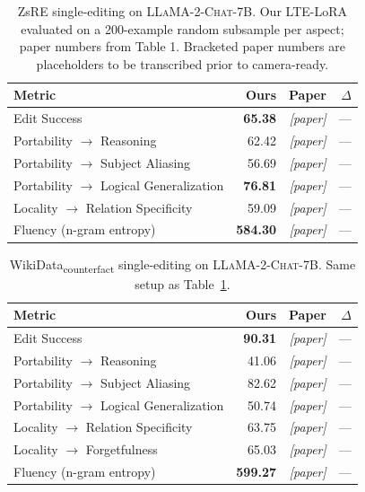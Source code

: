 \documentclass[11pt,a4paper,twocolumn]{article}
\begin{document}
\begin{table}[t]
\centering
\small
\caption{ZsRE single-editing on \textsc{LLaMA-2-Chat-7B}. Our LTE-LoRA evaluated on a 200-example random subsample per aspect; paper numbers from \citet{jiang2024learning} Table 1. Bracketed paper numbers are placeholders to be transcribed prior to camera-ready.}
\label{tab:zsre}
\begin{tabular}{lrrr}
\toprule
\textbf{Metric} & \textbf{Ours} & \textbf{Paper} & \textbf{$\Delta$} \\
\midrule
Edit Success                                       & \textbf{65.38} & \textit{[paper]}  & --- \\
Portability $\rightarrow$ Reasoning                & 62.42         & \textit{[paper]}  & --- \\
Portability $\rightarrow$ Subject Aliasing         & 56.69         & \textit{[paper]}  & --- \\
Portability $\rightarrow$ Logical Generalization   & \textbf{76.81}& \textit{[paper]}  & --- \\
Locality $\rightarrow$ Relation Specificity        & 59.09         & \textit{[paper]}  & --- \\
Fluency (n-gram entropy)                           & \textbf{584.30}& \textit{[paper]} & --- \\
\bottomrule
\end{tabular}
\end{table}

\begin{table}[t]
\centering
\small
\caption{WikiData\textsubscript{counterfact} single-editing on \textsc{LLaMA-2-Chat-7B}. Same setup as Table~\ref{tab:zsre}.}
\label{tab:counterfact}
\begin{tabular}{lrrr}
\toprule
\textbf{Metric} & \textbf{Ours} & \textbf{Paper} & \textbf{$\Delta$} \\
\midrule
Edit Success                                       & \textbf{90.31} & \textit{[paper]}  & --- \\
Portability $\rightarrow$ Reasoning                & 41.06         & \textit{[paper]}  & --- \\
Portability $\rightarrow$ Subject Aliasing         & 82.62         & \textit{[paper]}  & --- \\
Portability $\rightarrow$ Logical Generalization   & 50.74         & \textit{[paper]}  & --- \\
Locality $\rightarrow$ Relation Specificity        & 63.75         & \textit{[paper]}  & --- \\
Locality $\rightarrow$ Forgetfulness               & 65.03         & \textit{[paper]}  & --- \\
Fluency (n-gram entropy)                           & \textbf{599.27}& \textit{[paper]} & --- \\
\bottomrule
\end{tabular}
\end{table}
\end{document}
